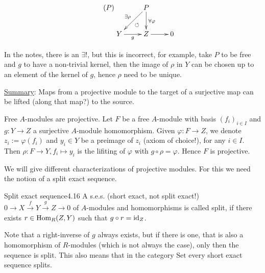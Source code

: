 \documentclass[twoside = false,	%
		headsepline,		%
		parskip = true,
		]{scrbook}						%
\begin{document}
    \begin{equation}\tag{$P$}\label{proj}
    \xymatrix {
        & P \ar[d]^{\forall \varphi} \ar[dl]_{\exists \rho}^{\circlearrowleft} \\
        Y \ar[r]_g & Z \ar[r] & 0
    }
    \end{equation}

    In the notes, there is an $\exists!$, but this is incorrect, for example, take $P$ to be free and $g$ to have a non-trivial kernel, then the image of $\rho$ in $Y$ can be chosen up to an element of the kernel of $g$, hence $\rho$ need to be unique.

    \underline{Summary}: Maps from a projective module to the target of a surjective map can be lifted (along that map?) to the source.

    \begin{example}{}{}
        Free $A$-modules are projective. Let $F$ be a free $A$-module with basis $(f_i)_{i \in I}$ and $g: Y \to Z$ a surjective $A$-module homomorphism. Given $\varphi: F \to Z$, we denote $z_i:= \varphi(f_i)$ and $y_i \in Y$ be a preimage of $z_i$ (axiom of choice!), for any $i \in I$. Then $\rho: F \to Y, f_i \mapsto y_i$ is the lifiting of $\varphi$ with $g \circ \rho = \varphi$. Hence $F$ is projective.
    \end{example}

    We will give different characterizations of projective modules. For this we need the notion of a split exact sequence.

    \begin{definition}{Split exact sequence}{4.16}
        A s.e.s. (short exact, not split exact!) $0 \to X \xrightarrow{f} Y \xrightarrow{g} Z \to 0$ of $A$-modules and homomorphisms is called split, if there exists $r \in \mathrm{Hom}_R(Z,Y)$ such that $g \circ r = \mathrm{id}_Z$.
    \end{definition}

    Note that a right-inverse of $g$ always exists, but if there is one, that is also a homomorphism of $R$-modules (which is not always the case), only then the sequence is split. This also means that in the category $\mathrm{Set}$ every short exact sequence splits.
\end{document}
